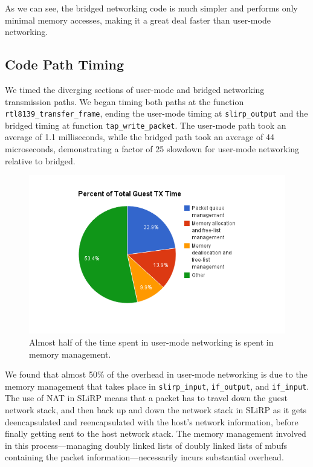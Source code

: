 As we can see, the bridged networking code is much simpler and performs only minimal memory accesses, making it a great deal faster than user-mode networking. 

\subsection{Code Path Timing}
\label{codePathTiming}
We timed the diverging sections of user-mode and bridged networking transmission paths. We began timing both paths at the function \texttt{rtl8139\_transfer\_frame}, ending the user-mode timing at \texttt{slirp\_output} and the bridged timing at function \texttt{tap\_write\_packet}. The user-mode path took an average of 1.1 milliseconds, while the bridged path took an average of 44 microseconds, demonstrating a factor of 25 slowdown for user-mode networking relative to bridged.

\begin{figure}[htbp]
	\centering
		\includegraphics[scale=0.5]{usermodeTXtime}
	\caption{Almost half of the time spent in user-mode networking is spent in memory management.}
	\label{fig:usermodeTXtime}
\end{figure}

We found that almost 50\% of the overhead in user-mode networking is due to the memory management that takes place in \texttt{slirp\_input}, \texttt{if\_output}, and \texttt{if\_input}. The use of NAT in SLiRP means that a packet has to travel down the guest network stack, and then back up and down the network stack in SLiRP as it gets deencapsulated and reencapsulated with the host's network information, before finally getting sent to the host network stack. The memory management involved in this process---managing doubly linked lists of doubly linked lists of mbufs containing the packet information---necessarily incurs substantial overhead. 
